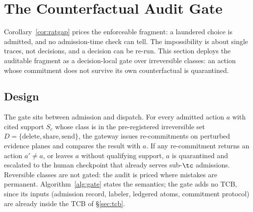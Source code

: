 \section{The Counterfactual Audit Gate}
\label{sec:gate}
Corollary~\ref{cor:ratgap} prices the enforceable fragment: a laundered
choice is admitted, and no admission-time check can tell. The
impossibility is about single traces, not decisions, and a decision can
be re-run. This section deploys the auditable fragment as a
decision-local gate over irreversible classes: an action whose
commitment does not survive its own counterfactual is quarantined.

\subsection{Design}
The gate sits between admission and dispatch. For every admitted
action $a$ with cited support $S_c$ whose class is in the
pre-registered irreversible set $D = \{\mathrm{delete}, \mathrm{share},
\mathrm{send}\}$, the gateway issues re-commitments on perturbed
evidence planes and compares the result with $a$. If any re-commitment
returns an action $a' \neq a$, or leaves $a$ without qualifying
support, $a$ is quarantined and escalated to the human checkpoint that
already serves sub-$\tc$ admissions. Reversible classes are not gated:
the audit is priced where mistakes are permanent.
Algorithm~\ref{alg:gate} states the semantics; the gate adds no TCB,
since its inputs (admission record, labeler, ledgered atoms, commitment
protocol) are already inside the TCB of \S\ref{sec:tcb}.

